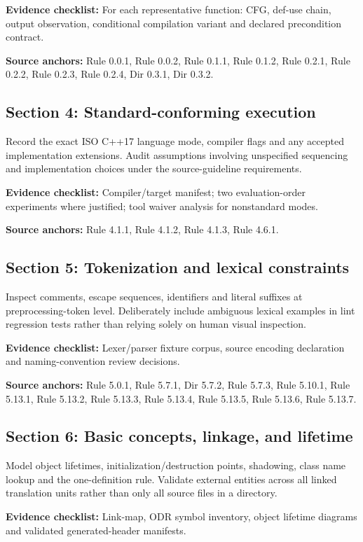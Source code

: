\documentclass[10pt,letterpaper]{article}
\begin{document}
\textbf{Evidence checklist:} For each representative function: CFG, def-use chain, output observation, conditional compilation variant and declared precondition contract.

\textbf{Source anchors:} Rule 0.0.1, Rule 0.0.2, Rule 0.1.1, Rule 0.1.2, Rule 0.2.1, Rule 0.2.2, Rule 0.2.3, Rule 0.2.4, Dir 0.3.1, Dir 0.3.2.

\subsection{Section 4: Standard-conforming execution}
Record the exact ISO C++17 language mode, compiler flags and any accepted implementation extensions. Audit assumptions involving unspecified sequencing and implementation choices under the source-guideline requirements.

\textbf{Evidence checklist:} Compiler/target manifest; two evaluation-order experiments where justified; tool waiver analysis for nonstandard modes.

\textbf{Source anchors:} Rule 4.1.1, Rule 4.1.2, Rule 4.1.3, Rule 4.6.1.

\subsection{Section 5: Tokenization and lexical constraints}
Inspect comments, escape sequences, identifiers and literal suffixes at preprocessing-token level. Deliberately include ambiguous lexical examples in lint regression tests rather than relying solely on human visual inspection.

\textbf{Evidence checklist:} Lexer/parser fixture corpus, source encoding declaration and naming-convention review decisions.

\textbf{Source anchors:} Rule 5.0.1, Rule 5.7.1, Dir 5.7.2, Rule 5.7.3, Rule 5.10.1, Rule 5.13.1, Rule 5.13.2, Rule 5.13.3, Rule 5.13.4, Rule 5.13.5, Rule 5.13.6, Rule 5.13.7.

\subsection{Section 6: Basic concepts, linkage, and lifetime}
Model object lifetimes, initialization/destruction points, shadowing, class name lookup and the one-definition rule. Validate external entities across all linked translation units rather than only all source files in a directory.

\textbf{Evidence checklist:} Link-map, ODR symbol inventory, object lifetime diagrams and validated generated-header manifests.
\end{document}
